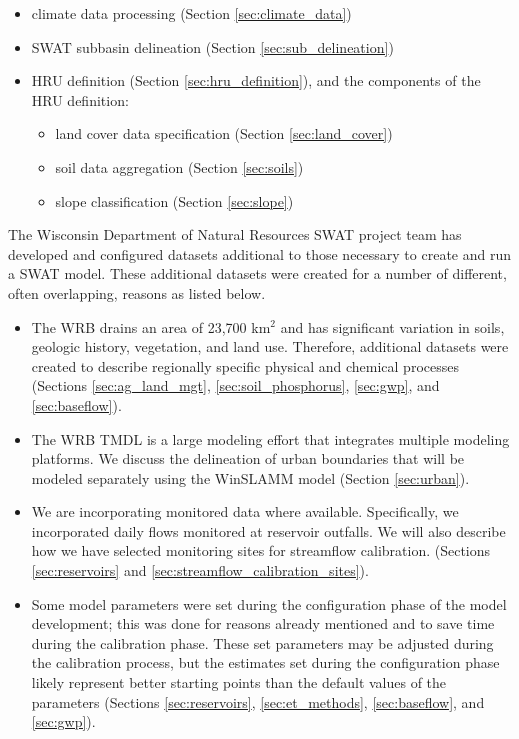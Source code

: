 \begin{itemize}
\item climate data processing (Section \ref{sec:climate_data})
\item SWAT subbasin delineation (Section \ref{sec:sub_delineation})
\item HRU definition (Section \ref{sec:hru_definition}), and the components of the HRU definition:
	\begin{itemize}
		\item land cover data specification (Section \ref{sec:land_cover})
		\item soil data aggregation (Section \ref{sec:soils})
		\item slope classification (Section \ref{sec:slope})
	\end{itemize}
\end{itemize}

The Wisconsin Department of Natural Resources SWAT project team has developed and configured datasets additional to those necessary to create and run a SWAT model. These additional datasets were created for a number of different, often overlapping, reasons as listed below. 
\begin{itemize}
\item The WRB drains an area of 23,700 km$^2$ and has significant variation in soils, geologic history, vegetation, and land use. Therefore, additional datasets were created to describe regionally specific physical and chemical processes (Sections \ref{sec:ag_land_mgt}, \ref{sec:soil_phosphorus}, \ref{sec:gwp}, and \ref{sec:baseflow}).

\item The WRB TMDL is a large modeling effort that integrates multiple modeling platforms. We discuss the delineation of urban boundaries that will be modeled separately using the WinSLAMM model (Section \ref{sec:urban}).

\item We are incorporating monitored data where available. Specifically, we incorporated daily flows monitored at reservoir outfalls. We will also describe how we have selected monitoring sites for streamflow calibration. (Sections \ref{sec:reservoirs} and \ref{sec:streamflow_calibration_sites}).
 
\item Some model parameters were set during the configuration phase of the model development; 
this was done for reasons already mentioned and to save time during the calibration phase. 
These set parameters may be adjusted during the calibration process, but the estimates set during the configuration phase likely represent better starting points than the default values of the parameters (Sections \ref{sec:reservoirs}, \ref{sec:et_methods}, \ref{sec:baseflow}, and \ref{sec:gwp}).
\end{itemize}

